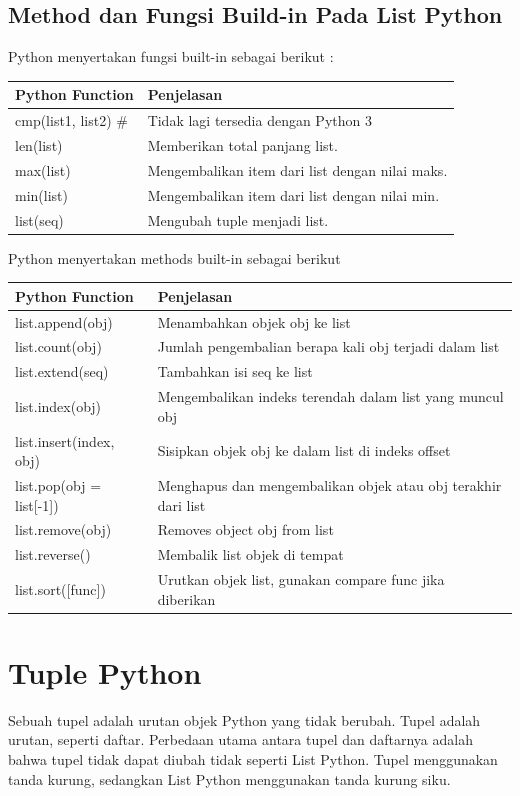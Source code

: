 \subsection{Method dan Fungsi Build-in Pada List Python}
Python menyertakan fungsi built-in sebagai berikut :
\begin{center}
\begin{tabular}{ | m{4cm} | m{4cm} | }
\hline
Python Function & Penjelasan \\
\hline
cmp(list1, list2) \# & Tidak lagi tersedia dengan Python 3 \\
\hline
len(list) & Memberikan total panjang list. \\
\hline
max(list) & Mengembalikan item dari list dengan nilai maks. \\
\hline
min(list) & Mengembalikan item dari list dengan nilai min. \\
\hline
list(seq) & Mengubah tuple menjadi list. \\
\hline
\end{tabular}
\end{center}

Python menyertakan methods built-in sebagai berikut
\begin{center}
\begin{tabular}{ | m{4cm} | m{4cm} | }
\hline
Python Function & Penjelasan \\
\hline
list.append(obj) & Menambahkan objek obj ke list \\
\hline
list.count(obj) & Jumlah pengembalian berapa kali obj terjadi dalam list \\
\hline
list.extend(seq) & Tambahkan isi seq ke list \\
\hline
list.index(obj) & Mengembalikan indeks terendah dalam list yang muncul obj \\
\hline
list.insert(index, obj) & Sisipkan objek obj ke dalam list di indeks offset \\
\hline
list.pop(obj = list[-1]) & Menghapus dan mengembalikan objek atau obj terakhir dari list \\
\hline
list.remove(obj) & Removes object obj from list \\
\hline
list.reverse() & Membalik list objek di tempat \\
\hline
list.sort([func]) & Urutkan objek list, gunakan compare func jika diberikan \\
\hline
\end{tabular}
\end{center}

\section{Tuple Python}
Sebuah tupel adalah urutan objek Python yang tidak berubah. Tupel adalah urutan, seperti daftar. Perbedaan utama antara tupel dan daftarnya adalah bahwa tupel tidak dapat diubah tidak seperti List Python. Tupel menggunakan tanda kurung, sedangkan List Python menggunakan tanda kurung siku.

